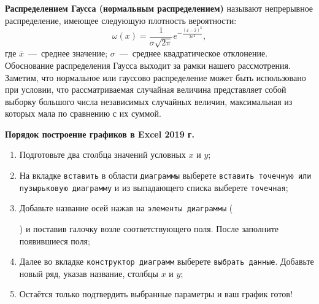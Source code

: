 \documentclass[14pt,a4paper]{article}
\begin{document}
\textbf{Распределением Гаусса (нормальным распределением)} называют непрерывное распределение, имеющее следующую плотность вероятности:\\
\begin{equation} \label{normalDistribution}
    \omega(x)  = \frac{1}{\sigma \sqrt{2\pi}}e^{-\frac{(x-\bar{x})^2}{2\sigma^2}},
\end{equation}
где $\bar{x}$~---~среднее значение; $\sigma$~---~среднее квадратическое отклонение. Обоснование распределения Гаусса выходит за рамки нашего рассмотрения. Заметим, что нормальное или гауссово распределение может быть использовано при условии, что рассматриваемая случайная величина представляет собой выборку большого числа независимых случайных величин, максимальная из которых мала по сравнению с их суммой.

    
\textbf{Порядок построение графиков в Excel 2019 г.}
\begin{enumerate}
    \item Подготовьте два столбца значений условных $x$ и $y$;
    \item На вкладке \texttt{вставить} в области \texttt{диаграммы} выберете \texttt{вставить точечную или пузырьковую диаграмму} и из выпадающего списка выберете \texttt{точечная};
    \item Добавьте название осей нажав на \texttt{элементы диаграммы} () и поставив галочку возле соответствующего поля. После заполните появившиеся поля;
    \item Далее во вкладке \texttt{конструктор диаграмм} выберете \texttt{выбрать данные}. Добавьте новый ряд, указав название, столбцы $x$ и $y$;
    \item Остаётся только подтвердить выбранные параметры и ваш график готов!
\end{enumerate}
\end{document}
